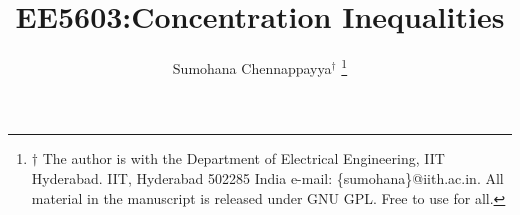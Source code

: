 \documentclass[journal,12pt,twocolumn]{IEEEtran}
\begin{document}

\def\putbox#1#2#3{\makebox[0in][l]{\makebox[#1][l]{}\raisebox{\baselineskip}[0in][0in]{\raisebox{#2}[0in][0in]{#3}}}}
     \def\rightbox#1{\makebox[0in][r]{#1}}
     \def\centbox#1{\makebox[0in]{#1}}
     \def\topbox#1{\raisebox{-\baselineskip}[0in][0in]{#1}}
     \def\midbox#1{\raisebox{-0.5\baselineskip}[0in][0in]{#1}}

\vspace{3cm}

\title{ 
EE5603:Concentration Inequalities
}


%
%
%

\author{Sumohana Chennappayya$^{\dagger}$ %
\thanks{$\dagger$ The author is with the Department of Electrical Engineering, IIT Hyderabad.  
IIT, Hyderabad
502285 India e-mail: \{sumohana\}@iith.ac.in. All material in the manuscript is released under GNU 
GPL.  Free to use for all.}%
}
% 
%
\end{document}

